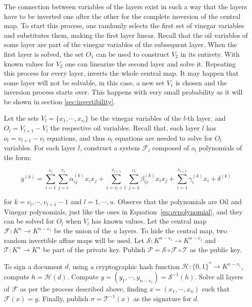 \documentclass{ufsctex/ufsctex}
\begin{document}
The connection between variables of the layers exist in such a way that the
layers have to be inverted one after the other for the complete inversion of
the central map. To start this process, one randomly selects the first set of
vinegar variables and substitutes them, making the first layer linear. Recall
that the oil variables of some layer are part of the vinegar variables of the
subsequent layer. When the first layer is solved, the set $O_1$ can be used to
construct $V_2$ in its entirety. With known values for $V_2$ one can linearize
the second layer and solve it. Repeating this process for every layer, inverts
the whole central map. It may happen that some layer will not be solvable, in
this case, a new set $V_1$ is chosen and the inversion process starts over.
This happens with very small probability as it will be shown in section
\ref{sec:invertibility}.

Let the sets $V_l = \{x_1, \cdots, x_{v_l}\}$ be the vinegar variables of the
$l$-th layer, and $O_l = V_{l+1} - V_l$ the respective oil variables. Recall
that, each layer $l$ has $o_l = v_{l+1} - v_{l}$ equations, and thus $o_l$
equations are needed to solve for $O_l$ variables. For each layer $l$,
construct a system $\mathcal{F}_l$ composed of $o_l$ polynomials of the form:

\begin{equation}\label{eq:rainbowmap}
y^{(k)} =
\sum_{i=1}^{v_l}\sum_{j=i}^{v_l} \alpha^{(k)}_{ij} x_i x_j +
\sum_{i=v_l+1}^{v_{l+1}}\sum_{j=1}^{v_l} \beta^{(k)}_{ij} x_i x_j +
\sum_{i=1}^{v_{l+1}} \gamma^{(k)}_{i} x_i +
\delta^{(k)}
\end{equation}

for $k = v_l, \cdots, v_{l+1} - 1$ and $l = 1, \cdots, u$. Observe that the
polynomials are Oil and Vinegar polynomials, just like the ones in
Equation~\ref{eq:ovpolynomial}, and they can be solved for $O_l$ when $V_l$ has
known values. Let the central map $\mathcal{F}:K^{n} \to K^{n-v_1}$ be the
union of the $u$ layers. To hide the central map, two random invertible affine
maps will be used. Let $\mathcal{S}:K^{n-v_1} \to K^{n-v_1}$ and
$\mathcal{T}:K^{n} \to K^{n}$ be part of the private key. Publish $\mathcal{P}
= \mathcal{S} \circ \mathcal{F} \circ \mathcal{T}$ as the public key.

To sign a document $d$, using a cryptographic hash function $\mathcal{H}:
\{0,1\}^* \to K^{n-v_1}$, compute $h = \mathcal{H}(d)$. Compute $y = (y_1,
\cdots, y_{n-v_1}) = \mathcal{S}^{-1}(h)$. Solve all layers of $\mathcal{F}$ as
per the process described above, finding $x = (x_1, \cdots, x_n)$ such that
$\mathcal{F}(x) = y$. Finally, publish $\sigma = \mathcal{T}^{-1}(x)$ as the
signature for $d$.
\end{document}
